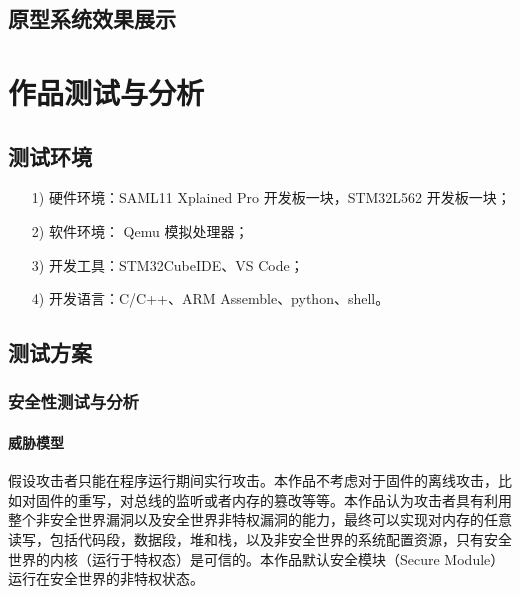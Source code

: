 \documentclass[UTF8,12pt,a4paper]{ctexart}
\numberwithin{figure}{section}
\begin{document}
\subsection{原型系统效果展示}

\section{作品测试与分析}
\subsection{测试环境}
\begin{itemize}
    \item[1)] 硬件环境：SAML11 Xplained Pro 开发板一块，STM32L562 开发板一块；
    \item[2)] 软件环境： Qemu 模拟处理器；
    \item[3)] 开发工具：STM32CubeIDE、VS Code；
    \item[4)] 开发语言：C/C++、ARM Assemble、python、shell。
\end{itemize}
\subsection{测试方案}
\subsubsection{安全性测试与分析}
\paragraph{威胁模型}
\par 假设攻击者只能在程序运行期间实行攻击。本作品不考虑对于固件的离线攻击，比如对固件的重写，对总线的监听或者内存的篡改等等。本作品认为攻击者具有利用整个非安全世界漏洞以及安全世界非特权漏洞的能力，最终可以实现对内存的任意读写，包括代码段，数据段，堆和栈，以及非安全世界的系统配置资源，只有安全世界的内核（运行于特权态）是可信的。本作品默认安全模块（Secure Module）运行在安全世界的非特权状态。
\end{document}
